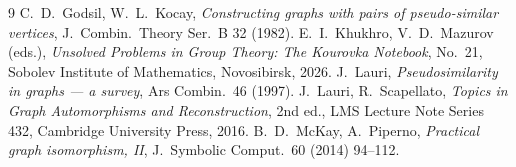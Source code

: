 \documentclass[11pt]{article}
\theoremstyle{remark}
\begin{document}
\begin{thebibliography}{9}
 C.~D.~Godsil, W.~L.~Kocay, \emph{Constructing graphs with
pairs of pseudo-similar vertices}, J.~Combin.\ Theory Ser.~B 32 (1982).
 E.~I.~Khukhro, V.~D.~Mazurov (eds.), \emph{Unsolved Problems
in Group Theory: The Kourovka Notebook}, No.~21, Sobolev Institute of
Mathematics, Novosibirsk, 2026.
 J.~Lauri, \emph{Pseudosimilarity in graphs --- a survey},
Ars Combin.\ 46 (1997).
 J.~Lauri, R.~Scapellato, \emph{Topics in Graph Automorphisms
and Reconstruction}, 2nd ed., LMS Lecture Note Series 432, Cambridge
University Press, 2016.
 B.~D.~McKay, A.~Piperno, \emph{Practical graph isomorphism,
II}, J.~Symbolic Comput.\ 60 (2014) 94--112.
\end{thebibliography}
\end{document}
